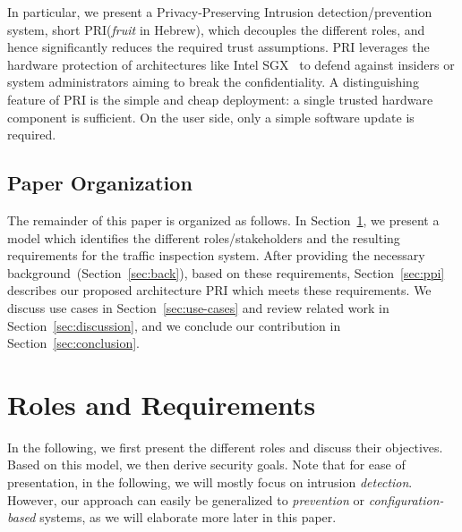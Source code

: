\documentclass{sig-alternate-10pt}
\newcommand{\sys}{PRI\xspace}
\begin{document}
In particular, we present a Privacy-Preserving
Intrusion detection/prevention system, short \sys (\emph{fruit} in Hebrew),   
which decouples the different roles,
and hence significantly reduces the required trust assumptions.
\sys leverages the hardware protection of
architectures like Intel SGX~\cite{white} to defend against 
insiders or system administrators aiming
to break the confidentiality. 
A distinguishing feature of \sys
is the simple and cheap deployment: 
a single trusted hardware component
is sufficient. On the user side,
only a simple software update is required. 

\newpage

\subsection{Paper Organization}

The remainder of this paper is organized as follows.
In Section~\ref{sec:model}, we present a model which
identifies the different roles/stakeholders and
the resulting requirements for the traffic inspection 
system. After providing the necessary background~(Section~\ref{sec:back}),
based on these requirements, Section~\ref{sec:ppi}
describes our proposed architecture \sys which meets these requirements.
We discuss use cases in Section~\ref{sec:use-cases} and review related work in Section~\ref{sec:discussion},
and we conclude our contribution in Section~\ref{sec:conclusion}.


\section{Roles and Requirements}\label{sec:model}

In the following, we first
present the different roles
and discuss their objectives.
Based on this model, we then derive
security goals.
Note that for ease of presentation,
in the following, we will mostly focus
on intrusion \emph{detection}.
However,
our approach can 
easily be generalized to \emph{prevention} or \emph{configuration-based} systems, 
as we will elaborate more later in this paper.
\end{document}
